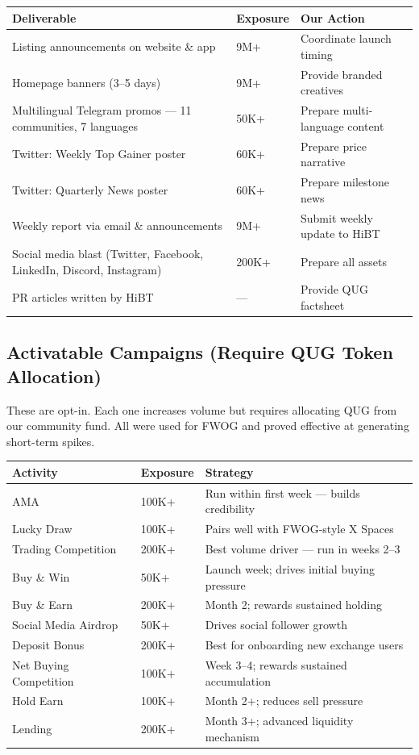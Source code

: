 \documentclass[11pt,a4paper]{article}
\begin{document}
\begin{center}
\begin{tabular}{L{6.5cm} C{2.5cm} L{4cm}}
  \toprule
  \textbf{Deliverable} & \textbf{Exposure} & \textbf{Our Action} \\
  \midrule
  Listing announcements on website \& app & 9M+ & Coordinate launch timing \\
  Homepage banners (3--5 days) & 9M+ & Provide branded creatives \\
  Multilingual Telegram promos — 11 communities, 7 languages & 50K+ & Prepare multi-language content \\
  Twitter: Weekly Top Gainer poster & 60K+ & Prepare price narrative \\
  Twitter: Quarterly News poster & 60K+ & Prepare milestone news \\
  Weekly report via email \& announcements & 9M+ & Submit weekly update to HiBT \\
  Social media blast (Twitter, Facebook, LinkedIn, Discord, Instagram) & 200K+ & Prepare all assets \\
  PR articles written by HiBT & --- & Provide QUG factsheet \\
  \bottomrule
\end{tabular}
\end{center}

\subsection{Activatable Campaigns (Require QUG Token Allocation)}

These are opt-in. Each one increases volume but requires allocating QUG from our community fund. All were used for FWOG and proved effective at generating short-term spikes.

\begin{center}
\begin{tabular}{L{3.5cm} C{2cm} L{7cm}}
  \toprule
  \textbf{Activity} & \textbf{Exposure} & \textbf{Strategy} \\
  \midrule
  AMA & 100K+ & Run within first week — builds credibility \\
  Lucky Draw & 100K+ & Pairs well with FWOG-style X Spaces \\
  Trading Competition & 200K+ & Best volume driver — run in weeks 2--3 \\
  Buy \& Win & 50K+ & Launch week; drives initial buying pressure \\
  Buy \& Earn & 200K+ & Month 2; rewards sustained holding \\
  Social Media Airdrop & 50K+ & Drives social follower growth \\
  Deposit Bonus & 200K+ & Best for onboarding new exchange users \\
  Net Buying Competition & 100K+ & Week 3--4; rewards sustained accumulation \\
  Hold Earn & 100K+ & Month 2+; reduces sell pressure \\
  Lending & 200K+ & Month 3+; advanced liquidity mechanism \\
  \bottomrule
\end{tabular}
\end{center}
\end{document}
